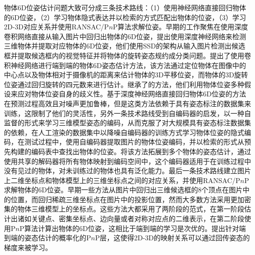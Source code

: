 物体6D位姿估计问题大致可分成三条技术路线：（1）使用神经网络直接回归物体的6D位姿，（2）学习物体隐式表达并以检索的方式匹配出物体的位姿，（3）学习2D-3D对应关系并使用RANSAC/P$n$P算法求解位姿。早期的工作聚焦在使用深度卷积网络直接从输入图片中回归出物体的6D位姿，\citet{Kehl_2017_ICCV}提出使用深度神经网络来检测三维物体并提取对应物体的6D位姿，他们使用SSD\citep{Liu2015SSDSS}的架构从输入图片检测出候选框并提取候选框内的视觉特征并将物体的旋转姿态规约成分类问题。\citet{xiang2018posecnn}提出了使用卷积神经网络进行端到端的物体6D姿态估计方法，该方法通过定位物体在图像中的中心点以及物体相对于摄像机的距离来估计物体的3D平移位姿，而物体的3D旋转位姿通过回归旋转的四元数来进行估计。\citet{Manhardt_2019_ICCV}继承了\citet{Kehl_2017_ICCV}的方法，他们利用物体位姿多种假设来应对物体位姿自身的歧义性。基于深度神经网络直接回归物体6D位姿的方法在预测过程高效且对噪声更加鲁棒，但是这类方法依赖于具有姿态标注的数据集来训练，这限制了他们的灵活性，另外一条技术路线受到自编码器的启发，以一种自监督的形式来学习三维模型姿态的编码，从而克服了对大规模具有姿态标注数据集的依赖，\citet{Sundermeyer2018Implicit3O}在人工渲染的数据集中以降噪自编码器的训练方式学习物体位姿的隐式编码，在测试过程中，使用自编码器提取图片的物体位姿编码，并以检索的形式从预先构建的编码表中查找出物体的位姿。\citet{Sundermeyer_2020_CVPR}将该方法拓展到多个物体的姿态估计，通过使用共享的解码器将所有物体映射到编码空间中，这个编码器适用于在训练过程中没有见过的物体，对未训练过的物体也具有泛化能力。最后一条技术路线建立图片上二维坐标点和物体模型上的三维坐标点之间的对应关系，并使用RANSAC/P$n$P求解物体的6D位姿。早期一些方法\citep{Tekin_2018_CVPR, Oberweger_2018_ECCV, Hu_2020_CVPR}从图片中回归出三维候选框的8个顶点在图片中的位置，而\citet{Peng_2019_CVPR, hu2019segpose}回归稀疏三维坐标点在图片中的投影位置，然而大多数方法\citep{Li_2019_ICCV, Park_2019_ICCV, zhao2017losses}采用更加密集的物体三维模型上的坐标点。这些方法大都采用了两阶段的范式，在第一阶段估计出诸如关键点、密集坐标点、边向量或者对称对应点的二维表示，在第二阶段使用P$n$P算法计算出物体的6D位姿，这相比于端到端的学习是次优的。\citet{Chen_2022_CVPR:epro_pnp}提出针对端到端的姿态估计的概率化的P$n$P层，这使得2D-3D的映射关系可以通过回传姿态的梯度来被学习。

